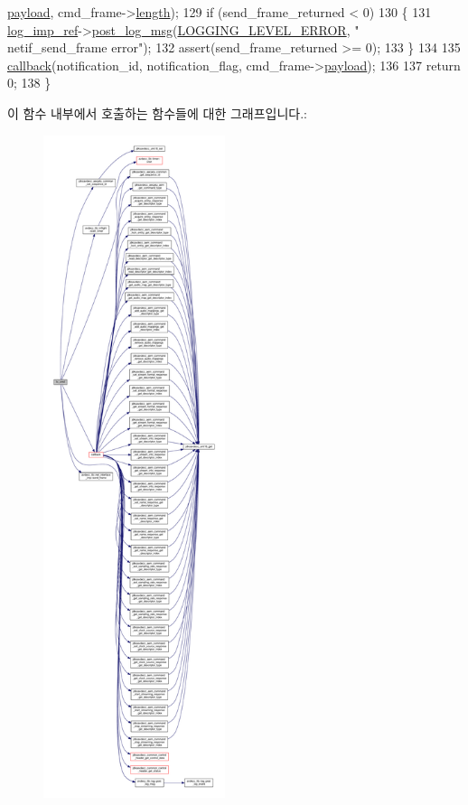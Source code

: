 \begin{DoxyCode}
      \hyperlink{structjdksavdecc__frame_a220ad076814a31ae0163e722e523de46}{payload}, cmd\_frame->\hyperlink{structjdksavdecc__frame_a1892eba2086d12ac2b09005aeb09ea3b}{length});
129     \textcolor{keywordflow}{if} (send\_frame\_returned < 0)
130     \{
131         \hyperlink{namespaceavdecc__lib_acbe3e2a96ae6524943ca532c87a28529}{log\_imp\_ref}->\hyperlink{classavdecc__lib_1_1log_a68139a6297697e4ccebf36ccfd02e44a}{post\_log\_msg}(\hyperlink{namespaceavdecc__lib_a501055c431e6872ef46f252ad13f85cdaf2c4481208273451a6f5c7bb9770ec8a}{LOGGING\_LEVEL\_ERROR}, \textcolor{stringliteral}{"
      netif\_send\_frame error"});
132         assert(send\_frame\_returned >= 0);
133     \}
134 
135     \hyperlink{classavdecc__lib_1_1aecp__controller__state__machine_a5803ae7099ff1a9c0721244e3d9b77b4}{callback}(notification\_id, notification\_flag, cmd\_frame->\hyperlink{structjdksavdecc__frame_a220ad076814a31ae0163e722e523de46}{payload});
136 
137     \textcolor{keywordflow}{return} 0;
138 \}
\end{DoxyCode}


이 함수 내부에서 호출하는 함수들에 대한 그래프입니다.\+:
\nopagebreak
\begin{figure}[H]
\begin{center}
\leavevmode
\includegraphics[height=550pt]{classavdecc__lib_1_1aecp__controller__state__machine_a1a1c2c9ae3773c01cbad352f2a2c2dfc_cgraph}
\end{center}
\end{figure}




